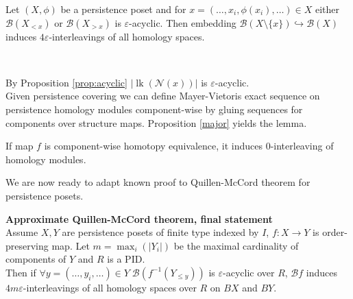 \begin{lemma}
  Let $(X,\phi)$ be a persistence poset and for $x=(\ldots,x_i,\phi(x_i),\ldots) \in X$ either $\mathcal{B}(X_{< x})$ or $\mathcal{B}(X_{> x})$ is $\varepsilon$-acyclic. Then embedding $\mathcal{B}(X \setminus \{x\}) \hookrightarrow \mathcal{B}(X)$ induces $4\varepsilon$-interleavings of all homology spaces.
\end{lemma}

\begin{pf} ~ \par
  By Proposition \ref{prop:acyclic} $\left|\operatorname{lk}(\mathcal{N}(x))\right|$ is $\varepsilon$-acyclic.\\

  Given persistence covering we can define Mayer-Vietoris exact sequence on persistence homology modules component-wise by gluing sequences for components over structure maps. Proposition \ref{major} yields the lemma.
\end{pf}

\begin{remark}
  If map $f$ is component-wise homotopy equivalence, it induces $0$-interleaving of homology modules.
\end{remark}

We are now ready to adapt known proof to Quillen-McCord theorem for persistence posets.

\begin{theorem} \textbf{Approximate Quillen-McCord theorem, final statement}\\
  Assume $X, Y$ are persistence posets of finite type indexed by $I$, $f : X \to Y$ is order-preserving map. Let $m = \max_{i}(|Y_i|)$ be the maximal cardinality of components of $Y$ and $R$ is a PID.\\

  Then if $\forall y=(\ldots,y_i,\ldots) \in Y\;\mathcal{B}(f^{-1}(Y_{\leqslant y}))$ is $\varepsilon$-acyclic over $R$, $\mathcal{B}f$ induces $4m\varepsilon$-interleavings of all homology spaces over $R$ on $BX$ and $BY$.\\
\end{theorem}

